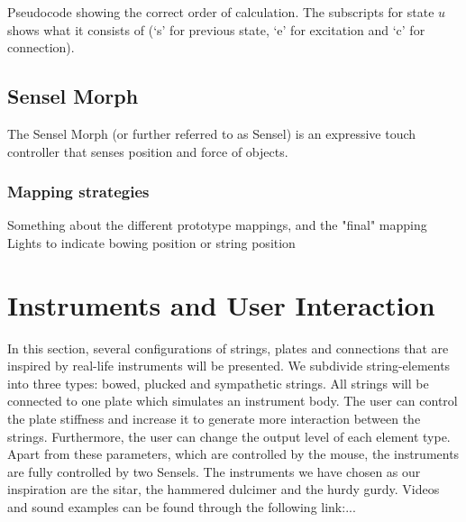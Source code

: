 \documentclass{article}
\begin{document}
\begin{algorithm}[h]\label{alg:calcOrder}
 \caption{Pseudocode showing the correct order of calculation. The subscripts for state $u$ shows what it consists of (`s' for previous state, `e' for excitation and `c' for connection).}
\end{algorithm}

\subsection{Sensel Morph}
The Sensel Morph (or further referred to as Sensel) is an expressive touch controller that senses position and force of objects.
\subsubsection{Mapping strategies}
Something about the different prototype mappings, and the "final" mapping 
Lights to indicate bowing position or string position   


\section{Instruments and User Interaction}\label{sec:instruments}
In this section, several configurations of strings, plates and connections that are inspired by real-life instruments will be presented. We subdivide string-elements into three types: bowed, plucked and sympathetic strings. All strings will be connected to one plate which simulates an instrument body. The user can control the plate stiffness and increase it to generate more interaction between the strings. Furthermore, the user can change the output level of each element type. Apart from these parameters, which are controlled by the mouse, the instruments are fully controlled by two Sensels. The instruments we have chosen as our inspiration are the sitar, the hammered dulcimer and the hurdy gurdy. Videos and sound examples can be found through the following link:...
\end{document}
